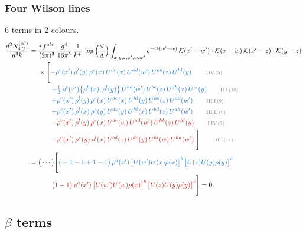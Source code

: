 \documentclass[10pt]{article}
\begin{document}
\subsubsection{Four Wilson lines}
6 terms in 2 colours.
\begin{align}
\frac{d^{3}N^{(\alpha')}_{4\,U}}{d^{3}k}={}&\frac{i\,f^{abc}}{(2\pi)^{3}}\,\frac{g^{4}}{16\pi^{5}}\,\frac{1}{k^{+}}\,\log\Big(\frac{\vee}{\Lambda}\Big)\int_{x,y,z,x',w,w'}e^{-ik(w'-w)}\,\mathcal{K}(x'-w')\cdot\mathcal{K}(x-w)\,\mathcal{K}(x'-z)\cdot\mathcal{K}(y-z)\notag\\
&\times\Bigg[{\color{RoyalBlue}-\rho^{c}(x')\,\rho^{l}(y)\,\rho^{e}(x)\,U^{de}(x)\,U^{ad}(w')\,U^{hb}(z)\,U^{hl}(y)}\tag*{\color{gray}\scriptsize I.IV\,(5)}\\
&\qquad{\color{RoyalBlue}-\tfrac{1}{2}\,\rho^{c}(x')\big\{\rho^{h}(x),\rho^{l}(y)\big\}\,U^{ad}(w')\,U^{be}(z)\,U^{dh}(x)\,U^{el}(y)}\tag*{\color{gray}\scriptsize II.I\,(10)}\\
&\qquad{\color{RoyalBlue}+\rho^{c}(x')\,\rho^{l}(y)\,\rho^{e}(x)\,U^{de}(x)\,U^{hl}(y)\,U^{hb}(z)\,U^{ad}(w')}\tag*{\color{gray}\scriptsize III.I\,(9)}\\
&\qquad{\color{RoyalBlue}+\rho^{c}(x')\,\rho^{l}(x)\,\rho^{e}(y)\,U^{de}(y)\,U^{hl}(x)\,U^{bd}(z)\,U^{ah}(w')}\tag*{\color{gray}\scriptsize III.II\,(9)}\\
&\qquad{\color{BrickRed}+\rho^{c}(x')\,\rho^{l}(y)\,\rho^{e}(x)\,U^{de}(w)\,U^{ad}(w')\,U^{hb}(z)\,U^{hl}(y)}\tag*{\color{gray}\scriptsize I.IV\,(7)}\\
&\qquad{\color{BrickRed}-\rho^{c}(x')\,\rho^{e}(y)\,\rho^{l}(x)\,U^{bd}(z)\,U^{de}(y)\,U^{hl}(w)\,U^{ha}(w')}\;\Bigg]\tag*{\color{gray}\scriptsize III.I\,(11)}\\
={}&\big(\cdots\big)\Bigg[{\color{RoyalBlue}\big(-1-1+1+1\big)\,\rho^{a}(x')\,\big[U(w')U(x)\rho(x)\big]^{b}\,\big[U(z)U(y)\rho(y)\big]^{c}}\notag\\
&\qquad{\color{BrickRed}\big(1-1\big)\,\rho^{a}(x')\,\big[U(w')U(w)\rho(x)\big]^{b}\,\big[U(z)U(y)\rho(y)\big]^{c}}\Bigg]=0.
\end{align}
\subsection{$\beta$ terms}
\end{document}
